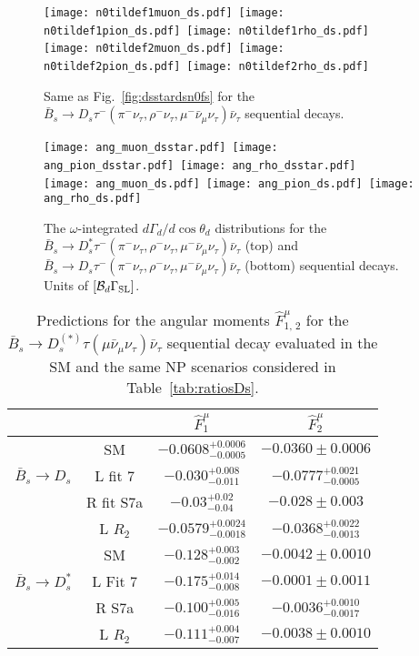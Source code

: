 \documentclass[aps,superscriptaddress,showpacs,nofootinbib,11pt]{revtex4-1}
\newcommand\tstrut{\rule{0pt}{2.9ex}}       %
\begin{document}
\begin{figure}
\begin{center}
\texttt{[image: n0tildef1muon\_ds.pdf]}\
\texttt{[image: n0tildef1pion\_ds.pdf]}\ 
\texttt{[image: n0tildef1rho\_ds.pdf]}\\
\texttt{[image: n0tildef2muon\_ds.pdf]}\
\texttt{[image: n0tildef2pion\_ds.pdf]}\ 
\texttt{[image: n0tildef2rho\_ds.pdf]}
\caption{ Same as Fig.~\ref{fig:dsstardsn0fs} for the $\bar B_s\to D_s\tau^-(\pi^-\nu_\tau,\rho^-\nu_\tau,\mu^-\bar\nu_\mu\nu_\tau)\bar\nu_\tau$ sequential decays. }
\label{fig:dsn0fs}
\end{center}
\end{figure}

\begin{figure}
\begin{center}
\texttt{[image: ang\_muon\_dsstar.pdf]}\
\texttt{[image: ang\_pion\_dsstar.pdf]}\
\texttt{[image: ang\_rho\_dsstar.pdf]}\\
\texttt{[image: ang\_muon\_ds.pdf]}\
\texttt{[image: ang\_pion\_ds.pdf]}\ 
\texttt{[image: ang\_rho\_ds.pdf]}
\caption{ The $\omega$-integrated $d\Gamma_d/d\cos\theta_d$ distributions for the $\bar B_s\to D_s^{*}\tau^-(\pi^-\nu_\tau,\rho^-\nu_\tau,\mu^-\bar\nu_\mu\nu_\tau)\bar\nu_\tau$ (top) and $\bar B_s\to D_s\tau^-(\pi^-\nu_\tau,\rho^-\nu_\tau,\mu^-\bar\nu_\mu\nu_\tau)\bar\nu_\tau$ (bottom) sequential decays. Units of $[{\cal B}_d\Gamma_{\rm SL}]$.}
\label{fig:dstardsang}
\end{center}
\end{figure}
\begin{table}[t]
\begin{center}
\begin{tabular}{c|c|cc}\hline\hline\tstrut
&& $\widehat F_{1}^{\mu}$& $\widehat F_{2}^{\mu}$\\ \hline \tstrut
&SM &$-0.0608^{+0.0006}_{-0.0005}$&$-0.0360\pm0.0006$\\ \tstrut
$\bar B_s\to D_s$&L fit 7&$-0.030^{+0.008}_{-0.011}$&$-0.0777^{+0.0021}_{-0.0005}$\\ \tstrut
&R fit S7a&$-0.03^{+0.02}_{-0.04}$&$-0.028\pm0.003$\\  \tstrut
&L $R_2$&$-0.0579^{+0.0024}_{-0.0018}$&$-0.0368^{+0.0022}_{-0.0013}$
\\ \hline \tstrut
&SM &$-0.128^{+0.003}_{-0.002}$&$-0.0042\pm0.0010$\\ \tstrut
$\bar B_s\to D^*_s$&L Fit 7&$-0.175^{+0.014}_{-0.008}$&$-0.0001\pm0.0011$\\ \tstrut
&R S7a&$-0.100^{+0.005}_{-0.016}$&$-0.0036^{+0.0010}_{-0.0017}$\\\tstrut
&L $R_2$&$-0.111^{+0.004}_{-0.007}$&$-0.0038\pm0.0010$\\  \hline\hline
\end{tabular}
%
\caption{ Predictions for the angular moments $\widehat F^{\mu}_{1,\,2}$ 
    for the
    $\bar B_s\to D^{(*)}_s\tau(\mu\bar\nu_\mu\nu_\tau)
    \bar\nu_\tau$ sequential decay evaluated in the SM and the same NP scenarios 
    considered in Table~\ref{tab:ratiosDs}.}
   \label{tab:hatfsDsDsstar1}
   \end{center}
\end{table}
\end{document}
